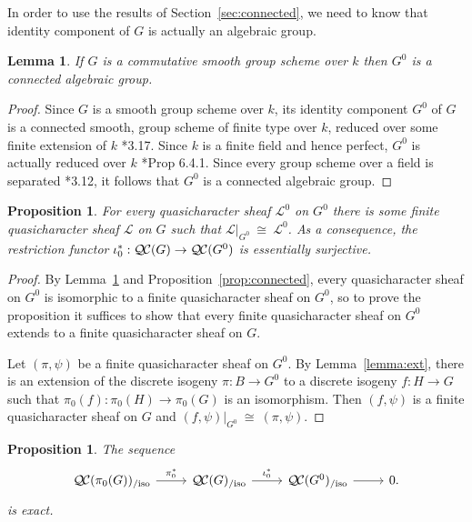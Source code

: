 \documentclass{amsart}
\theoremstyle{plain}
\newtheorem{proposition}[theorem]{Proposition}
\newtheorem{lemma}[theorem]{Lemma}
\theoremstyle{definition}
\theoremstyle{remark}
\newcommand{\Fq}{k}
\newcommand{\iso}{{\ \cong\ }}
\newcommand{\qcs}[1]{{\mathcal{#1}}}
\newcommand{\QC}{{\mathcal{Q\hskip-0.8pt C}}}
\newcommand{\QCiso}[1]{\QC(#1)_{/\text{iso}}}
\begin{document}
In order to use the results of Section~\ref{sec:connected}, we need to know that
identity component of $G$ is actually an algebraic group.

\begin{lemma} \label{lem:G0alg-grp}
If $G$ is a commutative smooth group scheme over $\Fq$ then $G^0$ is a connected algebraic group.
\end{lemma}
\begin{proof}
 Since $G$ is a smooth group scheme over $\Fq$, its
 identity component $G^0$ of $G$ is a connected smooth,
 group scheme of finite type over $\Fq$, reduced over some finite extension of $\Fq$
 \cite{vdGeer-Moonen:AbelianVarieties}*{3.17}.
 Since $\Fq$ is a finite field and hence perfect, $G^0$ is actually reduced over $\Fq$
 \cite{EGAIV2}*{Prop 6.4.1}.  Since every group scheme over a field is separated
 \cite{vdGeer-Moonen:AbelianVarieties}*{3.12},
 it follows that $G^0$ is a connected algebraic group.
\end{proof}

\begin{proposition}\label{prop:restriction}
For every quasicharacter sheaf $\qcs{L}^0$ on $G^0$ there is some finite quasicharacter sheaf
$\qcs{L}$ on $G$ such that $\qcs{L}\vert_{G^0} \iso \qcs{L}^0$.
As a consequence, the restriction functor $\iota_0^* : \QC(G)\to \QC(G^0)$ is essentially surjective.
\end{proposition}

\begin{proof}
  By Lemma~\ref{lem:G0alg-grp} and Proposition~\ref{prop:connected}, every
  quasicharacter sheaf on $G^0$ is isomorphic to a
  finite quasicharacter sheaf on $G^0$,
  so to prove the proposition it suffices to show that every
  finite quasicharacter sheaf on $G^0$ extends to a finite quasicharacter sheaf on $G$.

 Let $(\pi,\psi)$ be a finite quasicharacter sheaf on $G^0$.
 By Lemma~\ref{lemma:ext}, there is an extension of the
 discrete isogeny $\pi : B \to G^0$ to a discrete isogeny $f : H \to G$
 such that $\pi_0(f) : \pi_0(H)\to \pi_0(G)$ is an isomorphism.
 Then $(f,\psi)$ is a finite quasicharacter sheaf on $G$ and
 $(f,\psi)\vert_{G^0} \iso (\pi,\psi)$.
\end{proof}

\begin{proposition}\label{prop:middleexact}
 The sequence
 \[
  \begin{tikzcd}
 \QCiso{\pi_0(G)} \arrow{r}{\pi_0^*} & \QCiso{G} \arrow{r}{\iota_0^*} & \QCiso{G^0} \rar & 0.
  \end{tikzcd}
 \]
 is exact.
\end{proposition}
\end{document}
